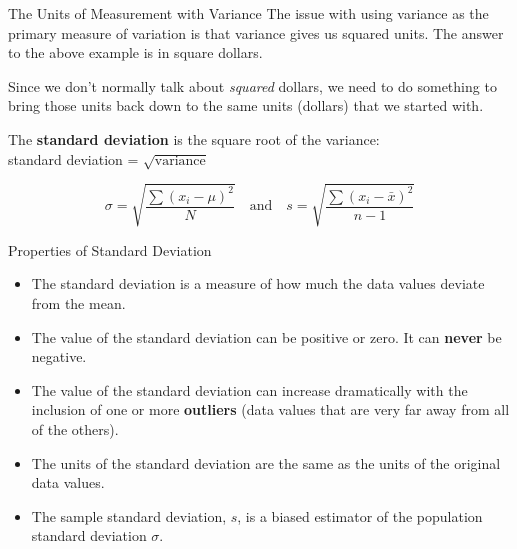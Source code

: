 \documentclass[t]{beamer}
\begin{document}
\begin{frame}{The Units of Measurement with Variance}
The issue with using variance as the primary measure of variation is that variance gives us squared units. The answer to the above example is in square dollars.	\newline\\	\pause

Since we don't normally talk about \emph{squared} dollars, we need to do something to bring those units back down to the same units (dollars) that we started with.	\newline\\	\pause

The {\color{blue}\textbf{standard deviation}} is the square root of the variance: \newline\\ standard deviation = $\sqrt{\text{variance}}$

\[\sigma = \sqrt{\frac{\sum (x_i-\mu)^2}{N}} \quad \text{and} \quad s = \sqrt{\frac{\sum (x_i-\bar{x})^2}{n-1}}\]
\end{frame}

\begin{frame}{Properties of Standard Deviation}
\begin{itemize}
	\item The standard deviation is a measure of how much the data values deviate from the mean.	\newline\\	\pause
	\item The value of the standard deviation can be positive or zero. It can {\color{red}\textbf{never}} be negative.	\newline\\	\pause
	\item The value of the standard deviation can increase dramatically with the inclusion of one or more {\color{blue}\textbf{outliers}} (data values that are very far away from all of the others).	\newline\\	\pause
	\item The units of the standard deviation are the same as the units of the original data values.	\newline\\	\pause
	\item The sample standard deviation, $s$, is a biased estimator of the population standard deviation $\sigma$.	
\end{itemize}
\end{frame}
\end{document}
